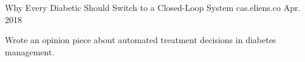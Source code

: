 

\begin{cventries}

  \cventry
    {} %
    {Why Every Diabetic Should Switch to a Closed-Loop System} %
    {cas.eliens.co} %
    {Apr. 2018} %
    {
      \begin{cvitems} %
        \item {Wrote an opinion piece about automated treatment decisions in diabetes management.}
      \end{cvitems}
    }

\end{cventries}

